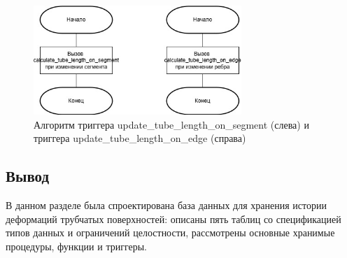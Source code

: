 \begin{figure}[H]
\centering
\includegraphics[width=0.7\textwidth]{img/update_tube_length_on_segment.jpg}
\caption{Алгоритм триггера update\_tube\_length\_on\_segment (слева) и триггера update\_tube\_length\_on\_edge (справа)}
\label{fig:updatetubelengthonsegment}
\end{figure}

\subsection{Вывод}

\noindent
\hspace{1.25cm}
В данном разделе была спроектирована база данных для хранения истории деформаций трубчатых поверхностей: описаны пять таблиц со спецификацией типов данных и ограничений целостности, рассмотрены основные хранимые процедуры, функции и триггеры.

\newpage